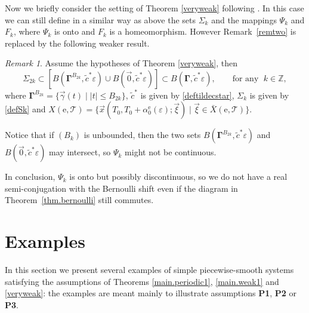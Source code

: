\documentclass[10pt]{article}
\numberwithin{equation}{section}
\def\al{\alpha}
\def\ga{\vec{\gamma}}
\def\ep{\varepsilon}
\def\Z{{\mathbb Z}}
\def\ee{{\mathrm e}}
\def\TT{{\mathcal T}}
\def\xxi{\vec{\xi}}
\def\x{\vec{x}}
\newcommand\bs[1]{{\boldsymbol{#1}}}
\newcommand\assump[1]{{\rm\textbf{#1}}}
\theoremstyle{definition}
\theoremstyle{remark}
\newtheorem{remark}[theorem]{Remark}
\begin{document}
 Now we briefly consider the setting of Theorem \ref{veryweak} following \cite[\S 6]{CFPrestate}. In this case
we can still define in a similar way as above the sets $\Sigma_k$ and the mappings
$\Psi_k$ and $F_k$, where $\Psi_k$ is onto and $F_k$ is a homeomorphism. However
Remark~\ref{remtwo} is replaced by the following weaker result.
 \begin{remark}\label{remthree}
 Assume the hypotheses of Theorem \ref{veryweak}, then
 $$
\Sigma_{2k} \subset [B(\bs{\Gamma}^{B_{2k}}, \tilde{c}^* \ep) \cup B(\vec{0}, \tilde{c}^* \ep)] \subset B(\bs{\Gamma}, \tilde{c}^* \ep), \qquad \textrm{for any } \; k \in \Z,$$
 where
  $\bs{\Gamma}^{B_{2k}}= \{ \ga(t) \mid |t| \le B_{2k} \}$, $\tilde{c}^*$ is given by \eqref{deftildecstar}, $\Sigma_k$ is given by \eqref{defSk} and
  $X(\ee, \TT)=\{\x(T_0,T_0+\al_0^\ee(\ep);\xxi)\mid \xxi\in\bar{X}(\ee,\TT)\}$.
\end{remark}
 Notice that if $(B_k)$ is unbounded, then the two sets $B(\bs{\Gamma}^{B_{2k}}, \tilde{c}^* \ep)$
 and $B(\vec{0}, \tilde{c}^* \ep)$ may intersect, so $\Psi_k$ might not be continuous.

In conclusion, $\Psi_k$ is onto but possibly discontinuous, so we do not have a real semi-conjugation with the Bernoulli shift even if the diagram in Theorem~\ref{thm.bernoulli} still commutes.



\section{Examples}\label{s.ex}
In this section we present several examples of simple piecewise-smooth systems satisfying the assumptions
of  Theorems \ref{main.periodic1}, \ref{main.weak1} and \ref{veryweak}: the examples are meant mainly to illustrate
assumptions
 \assump{P1}, \assump{P2} or \assump{P3}.
\end{document}
